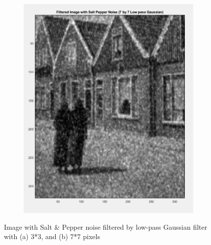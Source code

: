\begin{figure} [ht]
\begin{subfigure}{0.4\textwidth}
        \includegraphics[width=\textwidth]{Resources/F7-b.png}
        \caption{}
        \label{fig:Second}
    \end{subfigure}
    \caption{Image with Salt \& Pepper noise filtered by low-pass Gaussian filter with (a) 3*3, and (b) 7*7 pixels}
    \label{fig:salt and pepper noise filtered by low-pass Gaussian filter}
\end{figure}


